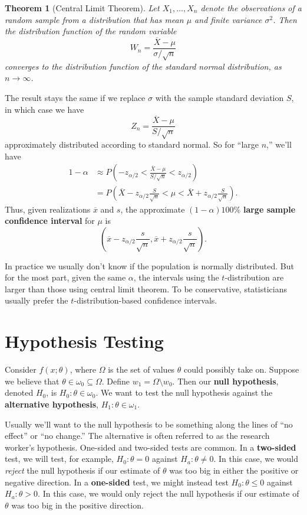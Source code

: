 \documentclass[12pt]{article}
\newcommand{\xbar}{\overline{X}}
\newtheorem{theorem}{Theorem}
\theoremstyle{definition}
\begin{document}
\begin{theorem}[Central Limit Theorem] Let $X_1, \hdots, X_n$ denote the observations of a random sample from a distribution that has mean $\mu$ and finite variance $\sigma^2$. Then the distribution function of the random variable
	\[W_n = \frac{\xbar - \mu}{\sigma / \sqrt{n}}\]
	converges to the distribution function of the standard normal distribution, as $n \rightarrow \infty$. 
\end{theorem}
The result stays the same if we replace $\sigma$ with the sample standard deviation $S$, in which case we have
	\[Z_n = \frac{\xbar - \mu}{S/\sqrt{n}}	 \]
approximately distributed according to standard normal. So for ``large $n$,'' we'll have
\begin{align*}
		1 - \alpha &\approx P\left(-z_{\alpha/2} < \frac{\xbar - \mu}{S/\sqrt{n}} < z_{\alpha/2} \right) \\
			&=P\left(\xbar -z_{\alpha/2}\frac{S}{\sqrt{n}} <  \mu < \xbar + z_{\alpha/2}\frac{S}{\sqrt{n}} \right).
\end{align*}
Thus, given realizations  $\overline{x}$ and $s$, the approximate $(1 - \alpha)100\%$ \textbf{large sample confidence interval} for $\mu$ is
	\[\left(\overline{x} -z_{\alpha/2}\frac{s}{\sqrt{n}}, \overline{x} + z_{\alpha/2}\frac{s}{\sqrt{n}} \right).	\]

In practice we usually don't know if the population is normally distributed. But for the most part, given the same $\alpha$, the intervals using the $t$-distribution are larger than those using central limit theorem. To be conservative, statisticians usually prefer the $t$-distribution-based confidence intervals. 




\section{Hypothesis Testing} 

Consider $f(x;\theta)$, where $\Omega$ is the set of values $\theta$ could possibly take on. Suppose we believe that $\theta \in \omega_0 \subseteq \Omega$. Define $w_1 = \Omega \setminus w_0$. Then our \textbf{null hypothesis}, denoted $H_0$, is $H_0 : \theta \in \omega_0$. We want to test the null hypothesis against the \textbf{alternative hypothesis}, $H_1 : \theta \in \omega_1$. 

Usually we'll want to the null hypothesis to be something along the lines of ``no effect'' or ``no change.'' The alternative is often referred to as the research worker's hypothesis. One-sided and two-sided tests are common. In a \textbf{two-sided} test, we will test, for example, $H_0: \theta=0$ against $H_a: \theta \neq 0$. In this case, we would \emph{reject} the null hypothesis if our estimate of $\theta$ was too big in either the positive or negative direction. In a \textbf{one-sided} test, we might instead test $H_0: \theta \leq 0$ against $H_a: \theta > 0$. In this case, we would only reject the null hypothesis if our estimate of $\theta$ was too big in the positive direction.
\end{document}

